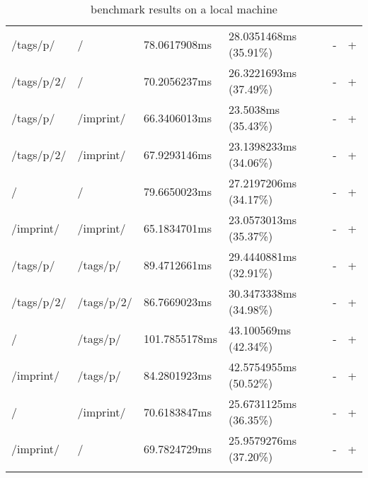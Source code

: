 \begin{center}
\begin{longtable}{llllll}
	\hline
	/tags/p/ & / & 78.0617908ms & 28.0351468ms (35.91\%) & - & + \\
	/tags/p/2/ & / & 70.2056237ms & 26.3221693ms (37.49\%) & - & + \\
	/tags/p/ & /imprint/ & 66.3406013ms & 23.5038ms (35.43\%) & - & + \\
	/tags/p/2/ & /imprint/ & 67.9293146ms & 23.1398233ms (34.06\%) & - & + \\
	\hline
	/ & / & 79.6650023ms & 27.2197206ms (34.17\%) & - & + \\
	/imprint/ & /imprint/ & 65.1834701ms & 23.0573013ms (35.37\%) & - & + \\
	/tags/p/ & /tags/p/ & 89.4712661ms & 29.4440881ms (32.91\%) & - & + \\
	/tags/p/2/ & /tags/p/2/ & 86.7669023ms & 30.3473338ms (34.98\%) & - & + \\
	\hline
	/ & /tags/p/ & 101.7855178ms & 43.100569ms (42.34\%) & - & + \\
	/imprint/ & /tags/p/ & 84.2801923ms & 42.5754955ms (50.52\%) & - & + \\
	\hline
	/ & /imprint/ & 70.6183847ms & 25.6731125ms (36.35\%) & - & + \\
	/imprint/ & / & 69.7824729ms & 25.9579276ms (37.20\%) & - & + \\
	\hline
\caption{\selenium{} benchmark results on a local machine}
\label{tab:selenium_benchmark_results_local}
\end{longtable}
\end{center}

\newpage{}

